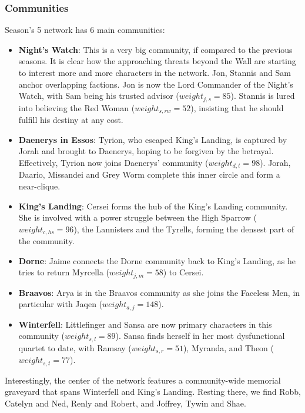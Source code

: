 \documentclass[10pt,twocolumn,letterpaper]{article}
\begin{document}
\subsubsection{Communities}

Season's 5 network has 6 main communities:

\begin{itemize}
    \item \textbf{Night's Watch}: This is a very big community, if compared to the previous seasons. It is clear how the approaching threats beyond the Wall are starting to interest more and more characters in the network. Jon, Stannis and Sam anchor overlapping factions. Jon is now the Lord Commander of the Night's Watch, with Sam being his trusted advisor ($weight_{j,s}=85$). Stannis is lured into believing the Red Woman ($weight_{s,rw}=52$), insisting that he should fulfill his destiny at any cost. 
    \item \textbf{Daenerys in Essos}: Tyrion, who escaped King's Landing, is captured by Jorah and brought to Daenerys, hoping to be forgiven by the betrayal. Effectively, Tyrion now joins Daenerys' community ($weight_{d,t}=98$). Jorah, Daario, Missandei and Grey Worm complete this inner circle and form a near-clique.
    \item \textbf{King's Landing}: Cersei forms the hub of the King’s Landing community. She is involved with a power struggle between the High Sparrow ($weight_{c,hs}=96$), the Lannisters and the Tyrells, forming the densest part of the community. 
    \item \textbf{Dorne}: Jaime connects the Dorne community back to King's Landing, as he tries to return Myrcella ($weight_{j,m}=58$) to Cersei.
    \item \textbf{Braavos}: Arya is in the Braavos community as she joins the Faceless Men, in particular with Jaqen ($weight_{a,j}=148$). 
    \item \textbf{Winterfell}: Littlefinger and Sansa are now primary characters in this community ($weight_{s,l}=89$). Sansa finds herself in her most dysfunctional quartet to date, with Ramsay ($weight_{s,r}=51$), Myranda, and Theon ($weight_{s,t}=77$).
\end{itemize}

Interestingly, the center of the network features a community-wide memorial graveyard that spans Winterfell and King’s Landing. Resting there, we find Robb, Catelyn and Ned, Renly and Robert, and Joffrey, Tywin and Shae.
\end{document}
